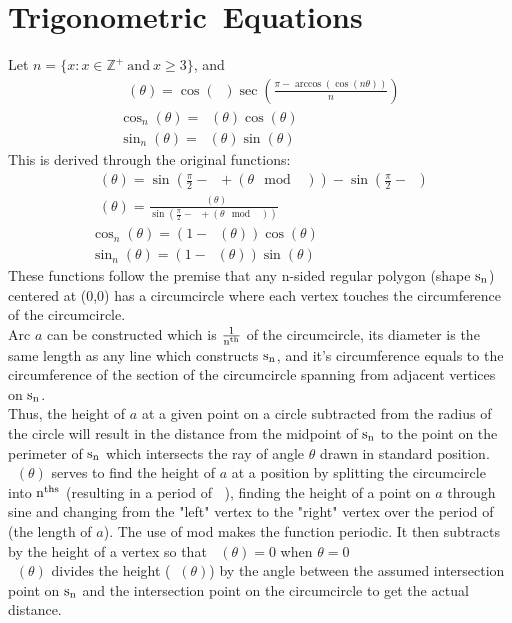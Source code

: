 \documentclass[11pt]{article}
\DeclareMathOperator{\custd}{\mathrm{d}_n}
\DeclareMathOperator{\custh}{\mathrm{h}_n}
\DeclareMathOperator{\period}{\frac{2\pi}{n}}
\DeclareMathOperator{\hp}{\frac{\pi}{n}}
\begin{document}
\section{Trigonometric\ Equations}
Let \(n=\{x:x\in\mathbb{Z}^+\ \mathrm{and}\ x\geq3\}\), and
\begin{gather*}
\custd(\theta)=\cos(\hp)\sec(\frac{\pi - \arccos(\cos(n\theta))}{n})\\
\cos_n(\theta)=\custd(\theta)\cos(\theta)\\
\sin_n(\theta)=\custd(\theta)\sin(\theta)
\end{gather*}
This is derived through the original functions:
\begin{gather*}
\custh(\theta)=\sin(\frac{\pi}{2}-\hp+(\theta\mod\period))-\sin(\frac{\pi}{2}-\hp)\\
\custd(\theta)=\frac{\custh(\theta)}{\sin(\frac{\pi}{2}-\hp+(\theta\mod\period))}\\
\cos_n(\theta)=(1-\custd(\theta))\cos(\theta)\\
\sin_n(\theta)=(1-\custd(\theta))\sin(\theta)
\end{gather*}
These functions follow the premise that any n-sided regular polygon (shape \(\rm s_n\)) centered at (0,0) has a circumcircle where each vertex touches the circumference of the circumcircle. \\
Arc \(a\) can be constructed which is \(\rm \frac{1}{n^{th}}\) of the circumcircle, its diameter is the same length as any line which constructs \(\rm s_n\), and it's circumference equals to the circumference of the section of the circumcircle spanning from adjacent vertices on \(\rm s_n\). \\
Thus, the height of \(a\) at a given point on a circle subtracted from the radius of the circle will result in the distance from the midpoint of \(\rm s_n\) to the point on the perimeter of \(\rm s_n\) which intersects the ray of angle \(\theta\) drawn in standard position.\\
\(\custh(\theta)\) serves to find the height of \(a\) at a position by splitting the circumcircle into \(\rm n^{ths}\) (resulting in a period of \(\period\)), finding the height of a point on \(a\) through sine and changing from the "left" vertex to the "right" vertex over the period of \(\period\) (the length of \(a\)). The use of mod makes the function periodic. It then subtracts by the height of a vertex so that \(\custh(\theta)=0\) when \(\theta=0\)\\
\(\custd(\theta)\) divides the height (\(\custh(\theta)\)) by the angle between the assumed intersection point on \(\rm s_n\) and the intersection point on the circumcircle to get the actual distance.\\
\end{document}

